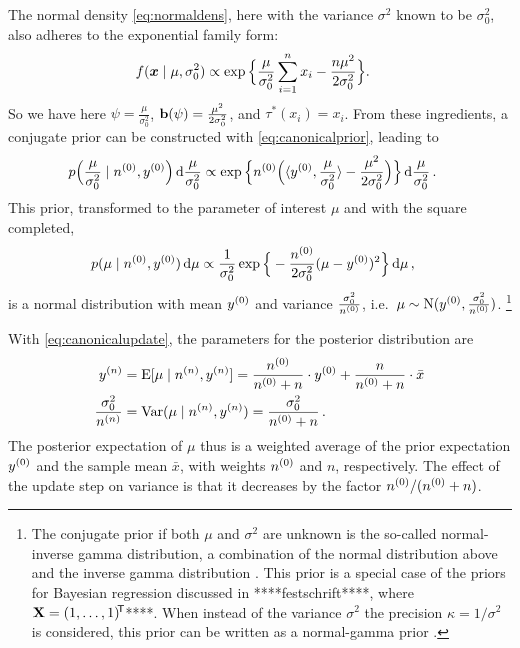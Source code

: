 The normal density \eqref{eq:normaldens}, here with the variance $\sigma^2$ known to be $\sigma^2_0$,
also adheres to the exponential family form:
\begin{align*}
f({\bm x} \mid \mu, \sigma_0^2)
 &\propto \exp\Big\{ \frac{\mu}{\sigma_0^2} \sum_{i=1}^n x_i - \frac{n\mu^2}{2\sigma_0^2} \Big\}.
\end{align*}
So we have here $\psi = \frac{\mu}{\sigma_0^2}$, $\mathbf{b}(\psi) = \frac{\mu^2}{2\sigma_0^2}$, and $\tau^*(x_i) = x_i$.
From these ingredients, a conjugate prior can be constructed with \eqref{eq:canonicalprior}, leading to
\begin{align*}
p\Big(\frac{\mu}{\sigma_0^2} \mid n^{(0)}, y^{(0)}\Big) \,\mathrm{d}\frac{\mu}{\sigma_0^2}
 &\propto \exp\Big\{ n^{(0)} \Big( \langle y^{(0)}, \frac{\mu}{\sigma_0^2} \rangle - \frac{\mu^2}{2\sigma_0^2} \Big) \Big\} \,\mathrm{d}\frac{\mu}{\sigma_0^2}\,.
\end{align*}
This prior, transformed to the parameter of interest $\mu$ and with the square completed,
\begin{align*}
p(\mu \mid n^{(0)}, y^{(0)}) \,\mathrm{d}\mu
 &\propto \frac{1}{\sigma_0^2} \exp\Big\{ -\frac{n^{(0)}}{2\sigma_0^2} (\mu - y^{(0)})^2 \Big\} \,\mathrm{d}\mu\,,
\end{align*}
is a normal distribution with mean $y^{(0)}$ and variance $\frac{\sigma_0^2}{n^{(0)}}$,
i.e.\ $\mu \sim \operatorname{N}(y^{(0)}, \frac{\sigma_0^2}{n^{(0)}})$.%
\footnote{The conjugate prior if both $\mu$ and $\sigma^2$ are unknown
is the so-called normal-inverse gamma distribution,
a combination of the normal distribution above and the inverse gamma distribution
\parencite[see, e.g.,][pp.~119, 431]{2000:bernardosmith}.
This prior is a special case of the priors for Bayesian regression discussed in ****festschrift****,
where $\mathbf{X} = (1, \ldots, 1)^{{\mbox{\!\scriptsize\textsf{T}}}}$****.
When instead of the variance $\sigma^2$ the precision $\kappa = 1/\sigma^2$ is considered,
this prior can be written as a normal-gamma prior
\parencite[see, e.g.,][pp.~136, 434]{2000:bernardosmith}.}

With \eqref{eq:canonicalupdate}, the parameters for the posterior distribution are
\begin{align}
y^{(n)} &= \operatorname{E}[\mu\mid n^{(n)}, y^{(n)}] = \frac{n^{(0)}}{n^{(0)} + n} \cdot y^{(0)} + \frac{n}{n^{(0)} + n} \cdot \bar{x} \label{eq:normalposte}\\
\frac{\sigma_0^2}{n^{(n)}} &= \operatorname{Var}(\mu\mid n^{(n)}, y^{(n)}) = \frac{\sigma_0^2}{n^{(0)} + n}\,. \label{eq:normalpostvar}
\end{align}
The posterior expectation of $\mu$ thus is a weighted average of the prior expectation $y^{(0)}$ and the sample mean $\bar{x}$,
with weights $n^{(0)}$ and $n$, respectively.
The effect of the update step on variance is that it decreases by the factor $n^{(0)}/(n^{(0)}+n)$.

